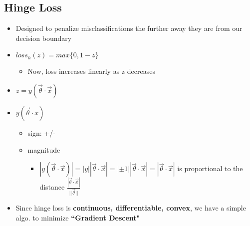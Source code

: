 \documentclass[10pt, oneside]{article}
\begin{document}
\subsection{Hinge Loss}
\begin{itemize}
    \item Designed to penalize misclassifications the further away they are from our decision boundary
    \item $loss_h (z) = max\{0,1-z\}$
    \begin{itemize}
        \item Now, loss increases linearly as z decreases
    \end{itemize}
    \item $z=y(\vec \theta \cdot \vec x)$
    \item $y(\vec \theta\cdot x)$
    \begin{itemize}
        \item sign: +/-
        \item magnitude
        \begin{itemize}
            \item $|y(\vec \theta\cdot \vec x)|=|y||\vec\theta\cdot \vec x|= |\pm 1| |\vec \theta\cdot \vec x| = |\vec \theta\cdot \vec x|$ is proportional to the distance $\frac{|\vec \theta \cdot \vec x|}{||\vec \theta||}$
        \end{itemize}
    \end{itemize}
    \item Since hinge loss is \textbf{continuous, differentiable, convex}, we have a simple algo. to minimize \textbf{``Gradient Descent"}
\end{itemize}
\end{document}
